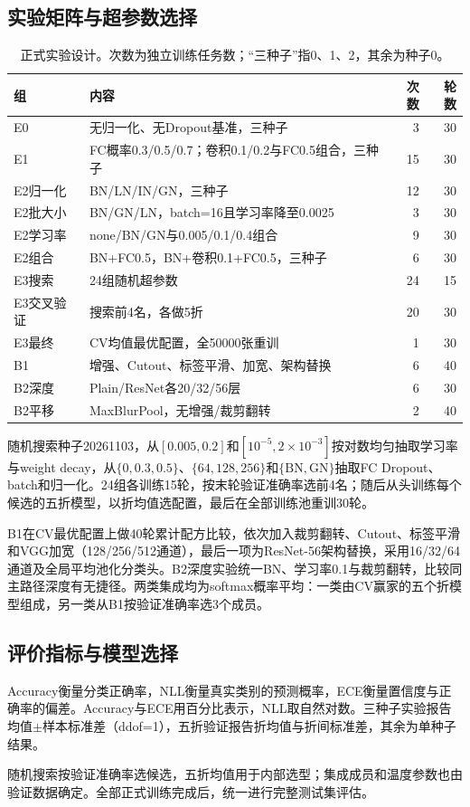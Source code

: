 \subsection{实验矩阵与超参数选择}
\begin{table}[htbp]\centering\small
\caption{正式实验设计。次数为独立训练任务数；“三种子”指0、1、2，其余为种子0。}\label{tab:design}
\begin{tabularx}{\linewidth}{lXrr}
\toprule 组 & 内容 & 次数 & 轮数\\\midrule
E0 & 无归一化、无Dropout基准，三种子 & 3 & 30\\
E1 & FC概率0.3/0.5/0.7；卷积0.1/0.2与FC0.5组合，三种子 & 15 & 30\\
E2归一化 & BN/LN/IN/GN，三种子 & 12 & 30\\
E2批大小 & BN/GN/LN，batch=16且学习率降至0.0025 & 3 & 30\\
E2学习率 & none/BN/GN与0.005/0.1/0.4组合 & 9 & 30\\
E2组合 & BN+FC0.5，BN+卷积0.1+FC0.5，三种子 & 6 & 30\\
E3搜索 & 24组随机超参数 & 24 & 15\\
E3交叉验证 & 搜索前4名，各做5折 & 20 & 30\\
E3最终 & CV均值最优配置，全50000张重训 & 1 & 30\\
B1 & 增强、Cutout、标签平滑、加宽、架构替换 & 6 & 40\\
B2深度 & Plain/ResNet各20/32/56层 & 6 & 30\\
B2平移 & MaxBlurPool，无增强/裁剪翻转 & 2 & 40\\\bottomrule
\end{tabularx}\end{table}

随机搜索种子20261103，从$[0.005,0.2]$和$[10^{-5},2\times10^{-3}]$按对数均匀抽取学习率与weight decay，从$\{0,0.3,0.5\}$、$\{64,128,256\}$和$\{\mathrm{BN},\mathrm{GN}\}$抽取FC Dropout、batch和归一化。24组各训练15轮，按末轮验证准确率选前4名；随后从头训练每个候选的五折模型，以折均值选配置，最后在全部训练池重训30轮。

B1在CV最优配置上做40轮累计配方比较，依次加入裁剪翻转、Cutout、标签平滑和VGG加宽（128/256/512通道），最后一项为ResNet-56架构替换，采用16/32/64通道及全局平均池化分类头。B2深度实验统一BN、学习率0.1与裁剪翻转，比较同主路径深度有无捷径。两类集成均为softmax概率平均：一类由CV赢家的五个折模型组成，另一类从B1按验证准确率选3个成员。

\subsection{评价指标与模型选择}\label{sec:boundaries}
Accuracy衡量分类正确率，NLL衡量真实类别的预测概率，ECE衡量置信度与正确率的偏差。Accuracy与ECE用百分比表示，NLL取自然对数。三种子实验报告均值$\pm$样本标准差（ddof=1），五折验证报告折均值与折间标准差，其余为单种子结果。

随机搜索按验证准确率选候选，五折均值用于内部选型；集成成员和温度参数也由验证数据确定。全部正式训练完成后，统一进行完整测试集评估。
